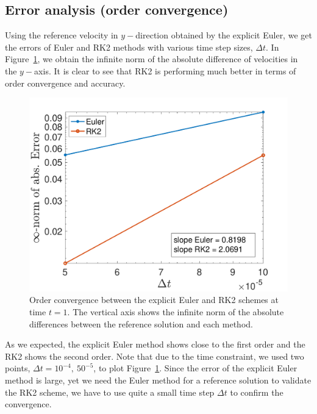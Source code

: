 \subsection{Error analysis (order convergence)}
Using the reference velocity in $y-$direction obtained by the explicit Euler, we get the errors of Euler and RK2 methods with various time step sizes, $\Delta t$. 
In Figure~\ref{fig_second_order_compare_err_time}, we obtain the infinite norm of the absolute difference of velocities in the $y-$axis. 
It is clear to see that RK2 is performing much better in terms of order convergence and accuracy. 
\begin{figure}[h]
  \begin{center}
    \includegraphics[scale=0.4]{figures/fig_granular_box212_8cube_infnorm}
    \end{center}
  \caption{Order convergence between the explicit Euler and RK2 schemes at time $t = 1$. The vertical axis shows the infinite norm of the absolute differences between the reference solution and each method.}
  \label{fig_second_order_compare_err_time}
\end{figure}
\par
As we expected, the explicit Euler method shows close to the first order and the RK2 shows the second order. Note that due to the time constraint, we used two points, $\Delta t = 10^{-4}, \ 50^{-5}$, to plot Figure~\ref{fig_second_order_compare_err_time}. Since the error of the explicit Euler method is large, yet we need the Euler method for a reference solution to validate the RK2 scheme, we have to use quite a small time step $\Delta t$ to confirm the convergence. 
